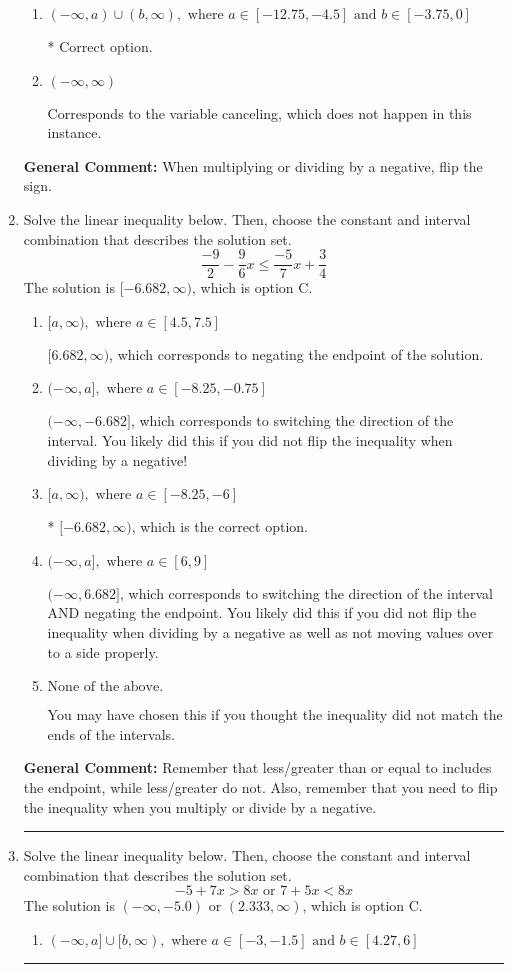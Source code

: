 \documentclass{extbook}[14pt]
\newcommand{\litem}[1]{\item #1

\rule{\textwidth}{0.4pt}}
\begin{document}
\begin{enumerate}
{\begin{enumerate}[label=\Alph*.]
Corresponds to including the endpoints AND negating.
\item \( (-\infty, a) \cup (b, \infty), \text{ where } a \in [-12.75, -4.5] \text{ and } b \in [-3.75, 0] \)

 * Correct option.
\item \( (-\infty, \infty) \)

Corresponds to the variable canceling, which does not happen in this instance.
\end{enumerate}

\textbf{General Comment:} When multiplying or dividing by a negative, flip the sign.
}
\litem{
Solve the linear inequality below. Then, choose the constant and interval combination that describes the solution set.
\[ \frac{-9}{2} - \frac{9}{6} x \leq \frac{-5}{7} x + \frac{3}{4} \]The solution is \( [-6.682, \infty) \), which is option C.\begin{enumerate}[label=\Alph*.]
\item \( [a, \infty), \text{ where } a \in [4.5, 7.5] \)

 $[6.682, \infty)$, which corresponds to negating the endpoint of the solution.
\item \( (-\infty, a], \text{ where } a \in [-8.25, -0.75] \)

 $(-\infty, -6.682]$, which corresponds to switching the direction of the interval. You likely did this if you did not flip the inequality when dividing by a negative!
\item \( [a, \infty), \text{ where } a \in [-8.25, -6] \)

* $[-6.682, \infty)$, which is the correct option.
\item \( (-\infty, a], \text{ where } a \in [6, 9] \)

 $(-\infty, 6.682]$, which corresponds to switching the direction of the interval AND negating the endpoint. You likely did this if you did not flip the inequality when dividing by a negative as well as not moving values over to a side properly.
\item \( \text{None of the above}. \)

You may have chosen this if you thought the inequality did not match the ends of the intervals.
\end{enumerate}

\textbf{General Comment:} Remember that less/greater than or equal to includes the endpoint, while less/greater do not. Also, remember that you need to flip the inequality when you multiply or divide by a negative.
}
\litem{
Solve the linear inequality below. Then, choose the constant and interval combination that describes the solution set.
\[ -5 + 7 x > 8 x \text{ or } 7 + 5 x < 8 x \]The solution is \( (-\infty, -5.0) \text{ or } (2.333, \infty) \), which is option C.\begin{enumerate}[label=\Alph*.]
\item \( (-\infty, a] \cup [b, \infty), \text{ where } a \in [-3, -1.5] \text{ and } b \in [4.27, 6] \)


\end{enumerate}}
\end{enumerate}
\end{document}
